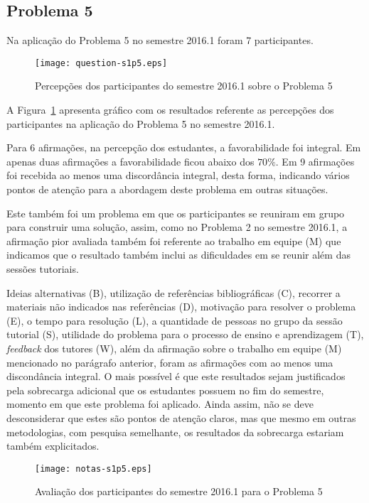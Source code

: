 \subsection{Problema 5}
Na aplicação do Problema 5 no semestre 2016.1 foram 7 participantes.

\begin{figure}[!htb]
\centering
\texttt{[image: question-s1p5.eps]}
\caption{Percepções dos participantes do semestre 2016.1 sobre o Problema 5}
\label{percep-s1p5}
\end{figure}

A Figura~\ref{percep-s1p5} apresenta gráfico com os resultados referente
as percepções dos participantes na aplicação do
Problema 5 no semestre 2016.1.

Para 6 afirmações, na percepção dos estudantes, a favorabilidade foi integral.
Em apenas duas afirmações a favorabilidade ficou abaixo dos $70\%$.
Em 9 afirmações foi recebida ao menos uma discordância integral, desta forma,
indicando vários pontos de atenção para a abordagem deste problema
em outras situações.

Este também foi um problema em que os participantes se reuniram em grupo para
construir uma solução, assim, como no Problema 2 no semestre 2016.1, a
afirmação pior avaliada também foi referente ao trabalho em equipe (M) que
indicamos que o resultado também inclui as dificuldades em se reunir além
das sessões tutoriais.

Ideias alternativas (B), utilização de referências bibliográficas (C),
recorrer a materiais não indicados nas referências (D), motivação
para resolver o problema (E), o tempo para resolução (L), a quantidade de
pessoas no grupo da sessão tutorial (S), utilidade do problema para o
processo de ensino e aprendizagem (T), \textit{feedback} dos
tutores (W), além da afirmação sobre o trabalho em equipe (M)
mencionado no parágrafo anterior, foram as afirmações com ao menos
uma discondância integral.
O mais possível é que este resultados sejam justificados pela sobrecarga
adicional que os estudantes possuem no fim do semestre, momento em que
este problema foi aplicado.
Ainda assim, não se deve desconsiderar que estes são pontos
de atenção claros, mas que mesmo em outras metodologias, com pesquisa
semelhante, os resultados da sobrecarga estariam também explicitados.

\begin{figure}[!htb]
\centering
\texttt{[image: notas-s1p5.eps]}
\caption{Avaliação dos participantes do semestre 2016.1 para o Problema 5}
\label{aval-s1p5}
\end{figure}

